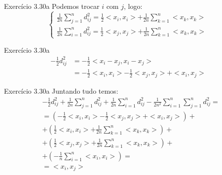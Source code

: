 \documentclass{beamer}
\begin{document}
\begin{frame} {Exerc\'icio 3.30a}
  Podemos trocar $i$ com $j$, logo:
  \[
  \begin{cases} 
    \frac{1}{2n} \sum_{j=1}^{n} d_{ij}^2 = \frac{1}{2} <x_i, x_i> + \frac{1}{2n} \sum_{k = 1}^{n} <x_k, x_k>  \\
    \frac{1}{2n} \sum_{i=1}^{n} d_{ij}^2 = \frac{1}{2} <x_j, x_j> + \frac{1}{2n} \sum_{k = 1}^{n} <x_k, x_k> 
  \end{cases}
  \]
\end{frame}

\begin{frame}{Exerc\'icio 3.30a}
  \begin{align}
    -\frac{1}{2} d_{ij}^2 &= -\frac{1}{2} <x_i - x_j, x_i - x_j> \\ \nonumber
                         &= -\frac{1}{2} <x_i, x_i> -\frac{1}{2} <x_j, x_j> + <x_i, x_j>
  \end{align}
\end{frame}

\begin{frame}{Exerc\'icio 3.30a}
  Juntando tudo temos:
  \begin{align}
    & -\frac{1}{2} d_{ij}^2 + \frac{1}{2n} \sum_{j = 1}^{n} d_{ij}^2 + \frac{1}{2n} \sum_{i = 1}^{n} d_{ij}^2 - \frac{1}{2n^2} \sum_{i = 1}^{n} \sum_{j = 1}^{n} d_{ij}^2 = \\ \nonumber
     &= \left( -\frac{1}{2} <x_i, x_i> -\frac{1}{2} <x_j, x_j> + <x_i, x_j> \right) + \\ \nonumber
     &+ \left( \frac{1}{2} <x_i, x_i> + \frac{1}{2n} \sum_{k = 1}^{n} <x_k, x_k> \right) + \\ \nonumber
     &+ \left( \frac{1}{2} <x_j, x_j> + \frac{1}{2n} \sum_{k = 1}^{n} <x_k, x_k> \right) + \\ \nonumber
     &+ \left( -\frac{1}{n} \sum_{i = 1}^{n} <x_i, x_i> \right) = \\ \nonumber
     &= <x_i, x_j>
  \end{align}
\end{frame}
\end{document}
